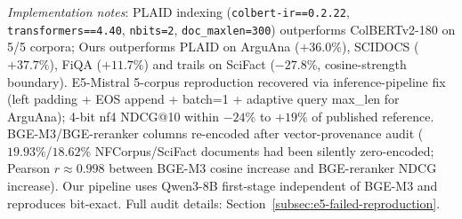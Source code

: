 \documentclass[review,1p]{elsarticle}
\begin{document}
\begin{table}[ht]
\centering
\caption{Re-evaluated baselines on identical splits. \textbf{Bold}: row winner. ColBERTv2 (110M, multi-vector); BGE-M3 (568M, Q8 single-vector); BGE-reranker-v2-m3 (568M, cross-encoder on BGE-M3 top-100); PLAID (centroid-pruned ColBERTv2, doc\_maxlen=300, nbits=2); E5-Mistral (7B, nf4 4-bit on consumer NVIDIA laptop GPU, fp16 compute, batch=1, max\_len$_q$=512 on ArguAna / 128 elsewhere); Ours (Qwen3-8B, no retrieval training). Quora cells empty (522K-doc scale).}
\label{tab:agent-b-baselines}
\footnotesize
{}

\vspace{4pt}
{\footnotesize \textit{Implementation notes}: PLAID indexing (\texttt{colbert-ir==0.2.22}, \texttt{transformers==4.40}, \texttt{nbits=2}, \texttt{doc\_maxlen=300}) outperforms ColBERTv2-180 on 5/5 corpora; Ours outperforms PLAID on ArguAna ($+36.0\%$), SCIDOCS ($+37.7\%$), FiQA ($+11.7\%$) and trails on SciFact ($-27.8\%$, cosine-strength boundary). E5-Mistral 5-corpus reproduction recovered via inference-pipeline fix (left padding + EOS append + batch=1 + adaptive query max\_len for ArguAna); 4-bit nf4 NDCG@10 within $-24\%$ to $+19\%$ of published reference. BGE-M3/BGE-reranker columns re-encoded after vector-provenance audit ($19.93\%$/$18.62\%$ NFCorpus/SciFact documents had been silently zero-encoded; Pearson $r \approx 0.998$ between BGE-M3 cosine increase and BGE-reranker NDCG increase). Our pipeline uses Qwen3-8B first-stage independent of BGE-M3 and reproduces bit-exact. Full audit details: Section~\ref{subsec:e5-failed-reproduction}.\par}
\end{table}
\end{document}
